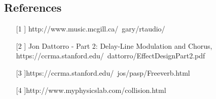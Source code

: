 \documentclass[pdftext,twoside,10pt]{article}
\begin{document}
\vspace{1cm}


\subsection*{References}

\begin{enumerate}
\item[[1]] http://www.music.mcgill.ca/~gary/rtaudio/
\item[[2]] Jon Dattorro - Part 2: Delay-Line Modulation and Chorus,  
https://ccrma.stanford.edu/~dattorro/EffectDesignPart2.pdf 
\item[[3]]https://ccrma.stanford.edu/~jos/pasp/Freeverb.html 
\item[[4]]http://www.myphysicslab.com/collision.html
\end{enumerate}
\end{document}
